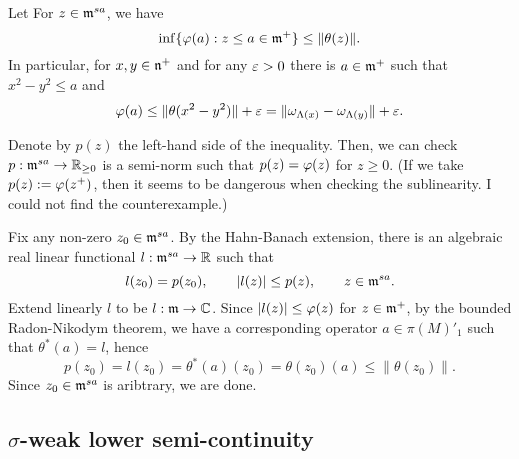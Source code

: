 \documentclass{../../small}
\begin{document}
\begin{lem}
Let 
For $z\in\mathfrak{m}^{sa}$, we have
\[\inf\{\varphi(a):z\le a\in\mathfrak{m}^+\}\le\|\theta(z)\|.\]
In particular, for $x,y\in\mathfrak{n}^+$ and for any $\varepsilon>0$ there is $a\in\mathfrak{m}^+$ such that $x^2-y^2\le a$ and
\[\varphi(a)\le\|\theta(x^2-y^2)\|+\varepsilon=\|\omega_{\Lambda(x)}-\omega_{\Lambda(y)}\|+\varepsilon.\]
\end{lem}
\begin{pf}
Denote by $p(z)$ the left-hand side of the inequality.
Then, we can check $p:\mathfrak{m}^{sa}\to\mathbb{R}_{\ge0}$ is a semi-norm such that $p(z)=\varphi(z)$ for $z\ge0$.
(If we take $p(z):=\varphi(z^+)$, then it seems to be dangerous when checking the sublinearity. I could not find the counterexample.)

Fix any non-zero $z_0\in\mathfrak{m}^{sa}$.
By the Hahn-Banach extension, there is an algebraic real linear functional $l:\mathfrak{m}^{sa}\to\mathbb{R}$ such that
\[l(z_0)=p(z_0),\qquad |l(z)|\le p(z),\qquad z\in\mathfrak{m}^{sa}.\]
Extend linearly $l$ to be $l:\mathfrak{m}\to\mathbb{C}$.
Since $|l(z)|\le\varphi(z)$ for $z\in\mathfrak{m}^+$, by the bounded Radon-Nikodym theorem, we have a corresponding operator $a\in\pi(M)'_1$ such that $\theta^*(a)=l$, hence
\[p(z_0)=l(z_0)=\theta^*(a)(z_0)=\theta(z_0)(a)\le\|\theta(z_0)\|.\]
Since $z_0\in\mathfrak{m}^{sa}$ is aribtrary, we are done.
\end{pf}




\subsection{$\sigma$-weak lower semi-continuity}
\end{document}
